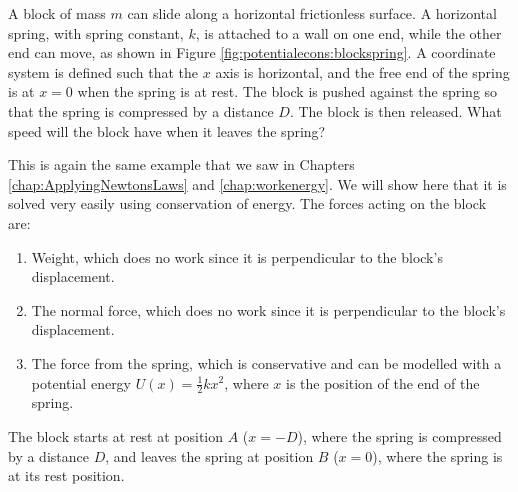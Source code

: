 \newpage
\begin{example}{\label{ex:potentialecons:blockspring}

A block of mass $m$ can slide along a horizontal frictionless surface. A horizontal spring, with spring constant, $k$, is attached to a wall on one end, while the other end can move, as shown in Figure \ref{fig:potentialecons:blockspring}. A coordinate system is defined such that the $x$ axis is horizontal, and the free end of the spring is at $x=0$ when the spring is at rest. The block is pushed against the spring so that the spring is compressed by a distance $D$. The block is then released. What speed will the block have when it leaves the spring?}
This is again the same example that we saw in Chapters \ref{chap:ApplyingNewtonsLaws} and \ref{chap:workenergy}. We will show here that it is solved very easily using conservation of energy. The forces acting on the block are:
\begin{enumerate}
\item Weight, which does no work since it is perpendicular to the block's displacement.
\item The normal force, which does no work since it is perpendicular to the block's displacement.
\item The force from the spring, which is conservative and can be modelled with a potential energy $U(x)=\frac{1}{2}kx^2$, where $x$ is the position of the end of the spring.
\end{enumerate}

The block starts at rest at position $A$ ($x=-D$), where the spring is compressed by a distance $D$, and leaves the spring at position $B$ ($x=0$), where the spring is at its rest position. 


\end{example}
